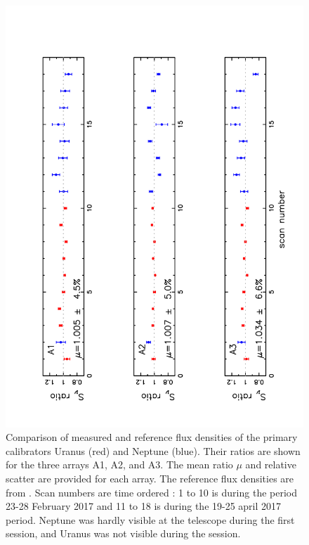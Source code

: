 \documentclass[]{aa} %
\begin{document}
\begin{figure}[h]
   \centering
    \includegraphics[angle=270,width=1.0\linewidth]{Ura_Nept_r9_10.pdf}     
    \caption{Comparison of  measured and reference flux densities of the primary calibrators Uranus (red) and Neptune (blue).
       Their ratios are shown for the three arrays A1, A2, and A3.
      The mean ratio $\mu$ and relative scatter are provided for each array. The reference flux densities are from \cite{moreno2010}. 
      Scan numbers are time ordered : 1 to 10 is during the period 23-28 February 2017 and 11 to 18
      is during the  19-25 april 2017 period. Neptune was hardly visible at the telescope during the first session,
      and Uranus was not visible during the session.}
         \label{fig:calibaccuracy}
\end{figure}
\end{document}
